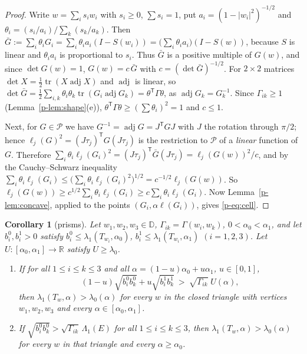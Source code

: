 \documentclass[11pt]{article}
\newtheorem{corollary}[theorem]{Corollary}
\theoremstyle{remark}
\newcommand{\R}{\mathbb{R}}
\newcommand{\cP}{\mathcal{P}}
\DeclareMathOperator{\tr}{tr}
\DeclareMathOperator{\adj}{adj}
\begin{document}
\begin{proof}
Write $w=\sum_is_iw_i$ with $s_i\ge0$, $\sum s_i=1$, put $a_i=(1-|w_i|^2)^{-1/2}$ and
$\theta_i=(s_i/a_i)/\sum_k(s_k/a_k)$. Then
$\bar G:=\sum_i\theta_iG_i=\sum_i\theta_ia_i(I-S(w_i))=\bigl(\sum_i\theta_ia_i\bigr)(I-S(w))$,
because $S$ is linear and $\theta_ia_i$ is proportional to $s_i$. Thus $\bar G$ is a positive
multiple of $G(w)$, and since $\det G(w)=1$, $G(w)=c\,\bar G$ with $c=(\det\bar G)^{-1/2}$. For
$2\times2$ matrices $\det X=\frac12\tr(X\adj X)$ and $\adj$ is linear, so
$\det\bar G=\frac12\sum_{i,k}\theta_i\theta_k\tr(G_i\adj G_k)=\theta^{\mathsf T}\Gamma\theta$,
as $\adj G_k=G_k^{-1}$. Since $\Gamma_{ik}\ge1$ (Lemma~\ref{p-lem:shape}(e)),
$\theta^{\mathsf T}\Gamma\theta\ge(\sum\theta_i)^2=1$ and $c\le1$.

Next, for $G\in\cP$ we have $G^{-1}=\adj G=J^{\mathsf T}GJ$ with $J$ the rotation through
$\pi/2$; hence $\ell_j(G)^2=(J\tau_j)^{\mathsf T}G(J\tau_j)$ is the restriction to $\cP$ of a
\emph{linear} function of $G$. Therefore
$\sum_i\theta_i\ell_j(G_i)^2=(J\tau_j)^{\mathsf T}\bar G(J\tau_j)=\ell_j(G(w))^2/c$, and by
the Cauchy--Schwarz inequality
$\sum_i\theta_i\ell_j(G_i)\le\bigl(\sum_i\theta_i\ell_j(G_i)^2\bigr)^{1/2}=c^{-1/2}\ell_j(G(w))$.
So $\ell_j(G(w))\ge c^{1/2}\sum_i\theta_i\ell_j(G_i)\ge c\sum_i\theta_i\ell_j(G_i)$. Now
Lemma~\ref{p-lem:concave}, applied to the points $(G_i,\alpha\ell(G_i))$, gives \eqref{p-eq:cell}.
\end{proof}

\begin{corollary}[prisms]\label{p-cor:prism}
Let $w_1,w_2,w_3\in\mathbb D$, $\Gamma_{ik}=\Gamma(w_i,w_k)$, $0<\alpha_0<\alpha_1$, and let
$b_i^0,b_i^1>0$ satisfy $b_i^0\le\lambda_1(T_{w_i},\alpha_0)$,
$b_i^1\le\lambda_1(T_{w_i},\alpha_1)$ $(i=1,2,3)$. Let $U:[\alpha_0,\alpha_1]\to\R$ satisfy
$U\ge\lambda_0$.
\begin{enumerate}
\item[\textup{(a)}] If for all $1\le i\le k\le3$ and all $\alpha=(1-u)\alpha_0+u\alpha_1$,
$u\in[0,1]$,
\begin{equation}\label{p-eq:prism}
  (1-u)\sqrt{b_i^0b_k^0}+u\sqrt{b_i^1b_k^1}\ >\ \sqrt{\Gamma_{ik}}\;U(\alpha),
\end{equation}
then $\lambda_1(T_w,\alpha)>\lambda_0(\alpha)$ for every $w$ in the closed triangle with
vertices $w_1,w_2,w_3$ and every $\alpha\in[\alpha_0,\alpha_1]$.
\item[\textup{(b)}] If $\sqrt{b_i^0b_k^0}>\sqrt{\Gamma_{ik}}\,\Lambda_1(E)$ for all
$1\le i\le k\le3$, then $\lambda_1(T_w,\alpha)>\lambda_0(\alpha)$ for every $w$ in that triangle
and every $\alpha\ge\alpha_0$.
\end{enumerate}
\end{corollary}
\end{document}
